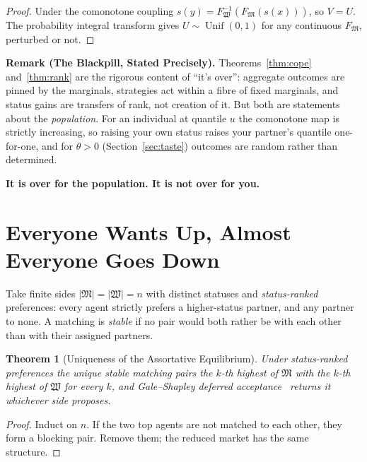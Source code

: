 \documentclass[11pt]{article}
\let\oldsection\section
\renewcommand{\section}{\Needspace{0.25\textheight}\oldsection}
\newtheorem{theorem}{Theorem}[section]
\theoremstyle{definition}
\theoremstyle{remark}
\newcommand{\M}{\mathfrak{M}}
\newcommand{\W}{\mathfrak{W}}
\DeclareMathOperator{\Unif}{Unif}
\begin{document}
\begin{proof}
  Under the comonotone coupling $s(y) = F_\W^{-1}(F_\M(s(x)))$, so $V
  = U$. The probability integral transform gives $U\sim\Unif(0,1)$
  for any continuous $F_\M$, perturbed or not.
\end{proof}

\begin{tcolorbox}[colback=white, colframe=black!50, boxrule=0.5pt]
  \textbf{Remark (The Blackpill, Stated Precisely).}
  Theorems~\ref{thm:cope} and~\ref{thm:rank} are the rigorous content
  of ``it's over'': aggregate outcomes are pinned by the marginals,
  strategies act within a fibre of fixed marginals, and status gains
  are transfers of rank, not creation of it. But both are statements
  about the \emph{population}. For an individual at quantile $u$ the
  comonotone map is strictly increasing, so raising your own status
  raises your partner's quantile one-for-one, and for $\theta > 0$
  (Section~\ref{sec:taste}) outcomes are random rather than determined.

  \begin{center}
    \bfseries It is over for the population. It is not over for you.
  \end{center}
\end{tcolorbox}

\section{Everyone Wants Up, Almost Everyone Goes Down}

Take finite sides $|\M| = |\W| = n$ with distinct statuses and
\emph{status-ranked} preferences: every agent strictly prefers a
higher-status partner, and any partner to none. A matching is
\emph{stable} if no pair would both rather be with each other than
with their assigned partners.

\begin{theorem}[Uniqueness of the Assortative Equilibrium]\label{thm:gs}
  Under status-ranked preferences the unique stable matching pairs
  the $k$-th highest of $\M$ with the $k$-th highest of $\W$ for
  every $k$, and Gale--Shapley deferred acceptance~\cite{gale}
  returns it whichever side proposes.
\end{theorem}

\begin{proof}
  Induct on $n$. If the two top agents are not matched to each other,
  they form a blocking pair. Remove them; the reduced market has the
  same structure.
\end{proof}
\end{document}
